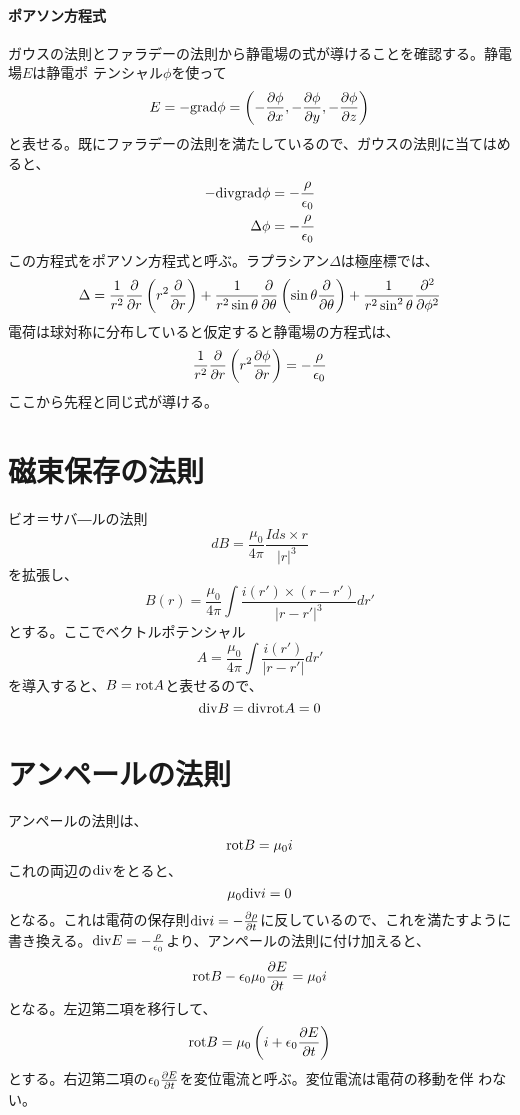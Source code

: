 \documentclass{jsarticle}
\begin{document}
        \paragraph{ポアソン方程式}
            ガウスの法則とファラデーの法則から静電場の式が導けることを確認する。静電場$E$は静電ポ
            テンシャル$\phi$を使って
                \[E = -\grad\phi = \lr{-\pd[\phi]{x},-\pd[\phi]{y},-\pd[\phi]{z}}\]
            と表せる。既にファラデーの法則を満たしているので、ガウスの法則に当てはめると、
            \begin{align*}
                -\dive\grad\phi = -\frac{\rho}{\epsilon_0}\\
                \Delta\phi = -\frac{\rho}{\epsilon_0}
            \end{align*}
            この方程式をポアソン方程式と呼ぶ。ラプラシアン$\Delta$は極座標では、
                \[\Delta = 
                    \rec{r^2}\pd{r}\lr{r^2\pd{r}}+
                    \rec{r^2\sin\theta}\pd{\theta}\lr{\sin\theta\pd{\theta}}+
                    \rec{r^2\sin^2\theta}\pd[^2]{\phi^2}\]
            電荷は球対称に分布していると仮定すると静電場の方程式は、
                \[\rec{r^2}\pd{r}\lr{r^2\pd[\phi]{r}} = -\frac{\rho}{\epsilon_0}\]
            ここから先程と同じ式が導ける。
    \section{磁束保存の法則}
        ビオ＝サバ―ルの法則
            \[dB = \frac{\mu_0}{4\pi}\frac{Ids\times r}{|r|^3}\]
        を拡張し、
            \[B(r) = \frac{\mu_0}{4\pi}
            \int \frac{i(r')\times (r-r')}{|r-r'|^3}dr'\]
        とする。ここでベクトルポテンシャル
            \[A = \frac{\mu_0}{4\pi}\int \frac{i(r')}{|r-r'|}dr'\]
        を導入すると、$B=\rot A$と表せるので、
            \[\dive B=\dive\rot A=0\]
    \section{アンペールの法則}
        アンペールの法則は、
            \[\rot B = \mu_0i\]
        これの両辺の$\dive$をとると、
            \[\mu_0\dive i = 0\]
        となる。これは電荷の保存則$\dive i = -\pd[\rho]{t}$に反しているので、これを満たすように
        書き換える。$\dive E = -\frac{\rho}{\epsilon_0}$より、アンペールの法則に付け加えると、
            \[\rot B - \epsilon_0\mu_0\pd[E]{t} = \mu_0 i\]
        となる。左辺第二項を移行して、
            \[\rot B = \mu_0\lr{i + \epsilon_0\pd[E]{t}}\]
        とする。右辺第二項の$\epsilon_0\pd[E]{t}$を変位電流と呼ぶ。変位電流は電荷の移動を伴
        わない。
\end{document}
